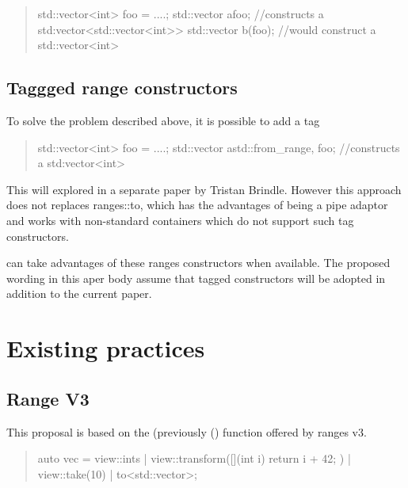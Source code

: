 \documentclass{wg21}
\begin{document}
\begin{quote}
\begin{colorblock}
std::vector<int> foo = ....;
std::vector a{foo}; //constructs a std:vector<std::vector<int>>
std::vector b(foo); //would construct a std::vector<int>
\end{colorblock}
\end{quote}

\subsection{Taggged range constructors}

To solve the problem described above, it is possible to add a tag

\begin{quote}
\begin{colorblock}
std::vector<int> foo = ....;
std::vector a{std::from_range, foo}; //constructs a std:vector<int>
\end{colorblock}
\end{quote}

This will explored in a separate paper by Tristan Brindle.
However this approach does not replaces ranges::to, which has the advantages of being a pipe adaptor and works with
non-standard containers which do not support such tag constructors.

 can take advantages of these ranges constructors when available.
The proposed wording in this aper body assume that tagged constructors will be adopted in addition to the current paper. 


\section{Existing practices}


\subsection{Range V3}

This proposal is based on the  (previously () function offered by ranges v3.


\begin{quote}
	\begin{colorblock}
		auto vec = view::ints
		| view::transform([](int i) {
			return i + 42;
		})
		| view::take(10)
		| to<std::vector>;
	\end{colorblock}
\end{quote}
\end{document}
